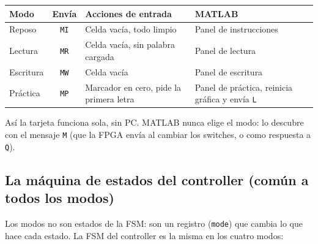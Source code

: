 \documentclass[11pt,a4paper]{article}
\newcommand{\cod}[1]{\texttt{#1}}
\begin{document}
\begin{center}
\begin{tabularx}{\linewidth}{l c >{\raggedright}X >{\raggedright\arraybackslash}X}
\toprule
\textbf{Modo} & \textbf{Envía} & \textbf{Acciones de entrada} & \textbf{MATLAB} \\
\midrule
Reposo & \cod{MI} & Celda vacía, todo limpio & Panel de instrucciones \\
Lectura & \cod{MR} & Celda vacía, sin palabra cargada & Panel de lectura \\
Escritura & \cod{MW} & Celda vacía & Panel de escritura \\
Práctica & \cod{MP} & Marcador en cero, pide la primera letra & Panel de práctica, reinicia gráfica y envía \cod{L} \\
\bottomrule
\end{tabularx}
\end{center}

\begin{idea}
Así la tarjeta funciona sola, sin PC. MATLAB nunca elige el modo: lo descubre con el
mensaje \cod{M} (que la FPGA envía al cambiar los switches, o como respuesta a \cod{Q}).
\end{idea}

\subsection{La máquina de estados del controller (común a todos los modos)}

Los modos no son estados de la FSM: son un registro (\cod{mode}) que cambia lo que
hace cada estado. La FSM del controller es la misma en los cuatro modos:
\end{document}
